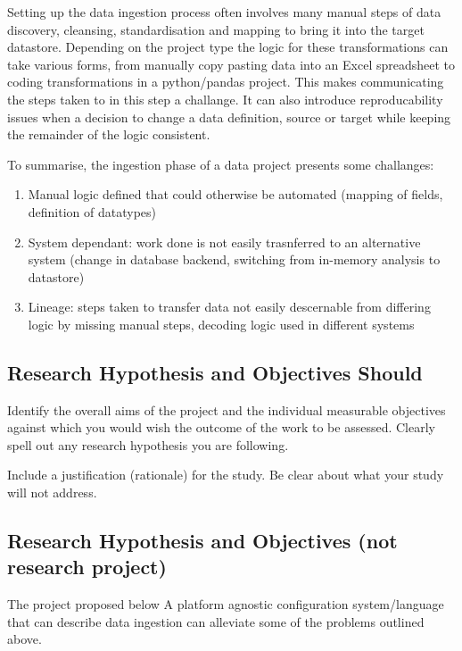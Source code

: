 Setting up the data ingestion process often involves many manual steps
of data discovery, cleansing, standardisation and mapping to bring it
into the target datastore. Depending on the project type the logic for
these transformations can take various forms, from manually copy pasting
data into an Excel spreadsheet to coding transformations in a
python/pandas project. This makes communicating the steps taken to in
this step a challange. It can also introduce reproducability issues when
a decision to change a data definition, source or target while keeping
the remainder of the logic consistent.

To summarise, the ingestion phase of a data project presents some
challanges:

\begin{enumerate}
\def\labelenumi{\arabic{enumi}.}
\tightlist
\item
  Manual logic defined that could otherwise be automated (mapping of
  fields, definition of datatypes)
\item
  System dependant: work done is not easily trasnferred to an
  alternative system (change in database backend, switching from
  in-memory analysis to datastore)
\item
  Lineage: steps taken to transfer data not easily descernable from
  differing logic by missing manual steps, decoding logic used in
  different systems
\end{enumerate}

\subsection{Research Hypothesis and Objectives
Should}\label{research-hypothesis-and-objectives-should}

Identify the overall aims of the project and the individual measurable
objectives against which you would wish the outcome of the work to be
assessed. Clearly spell out any research hypothesis you are following.

Include a justification (rationale) for the study. Be clear about what
your study will not address.

\subsection{Research Hypothesis and Objectives (not research
project)}\label{research-hypothesis-and-objectives-not-research-project}

The project proposed below A platform agnostic configuration
system/language that can describe data ingestion can alleviate some of
the problems outlined above.

